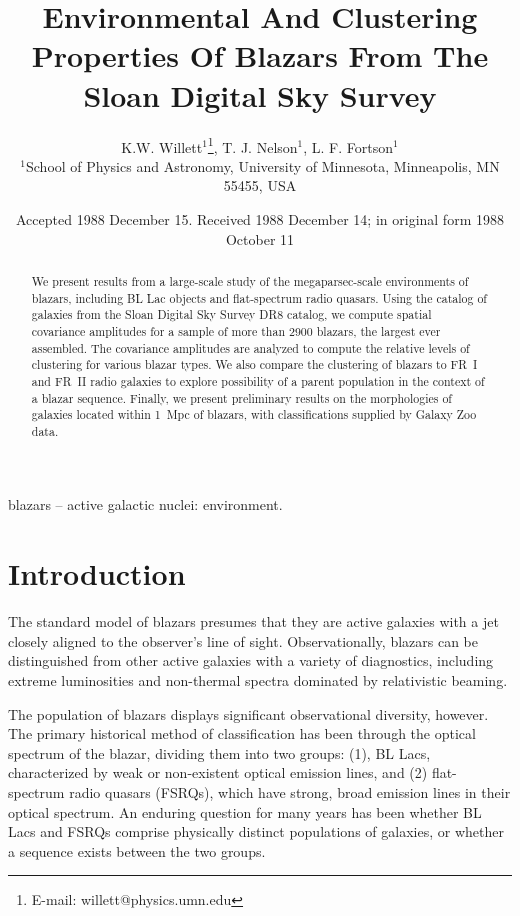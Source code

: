 \documentclass[useAMS,usenatbib]{mn2e}
\title[Clustering properties of blazars]{Environmental And Clustering Properties Of Blazars From The Sloan Digital Sky Survey}
\author[K.W. Willett, T.J. Nelson, \& L.F. Fortson]{K.W. Willett$^{1}$\thanks{E-mail: willett@physics.umn.edu}, T. J. Nelson$^{1}$, L. F. Fortson$^{1}$\\
$^{1}$School of Physics and Astronomy, University of Minnesota, Minneapolis, MN 55455, USA}
\begin{document}
\date{Accepted 1988 December 15. Received 1988 December 14; in original form 1988 October 11}

\pagerange{\pageref{firstpage}--\pageref{lastpage}} 

\maketitle

\label{firstpage}

\begin{abstract}
We present results from a large-scale study of the megaparsec-scale environments of blazars, including BL Lac objects and flat-spectrum radio quasars. Using the catalog of galaxies from the Sloan Digital Sky Survey DR8 catalog, we compute spatial covariance amplitudes for a sample of more than 2900 blazars, the largest ever assembled. The covariance amplitudes are analyzed to compute the relative levels of clustering for various blazar types. We also compare the clustering of blazars to FR~I and FR~II radio galaxies to explore possibility of a parent population in the context of a blazar sequence. Finally, we present preliminary results on the morphologies of galaxies located within 1~Mpc of blazars, with classifications supplied by Galaxy Zoo data.
\end{abstract}

\begin{keywords}
blazars -- active galactic nuclei: environment.
\end{keywords}

\section{Introduction} \label{sec-intro}


The standard model of blazars presumes that they are active galaxies with a jet closely aligned to the observer's line of sight. Observationally, blazars can be distinguished from other active galaxies with a variety of diagnostics, including extreme luminosities and non-thermal spectra dominated by relativistic beaming. 

The population of blazars displays significant observational diversity, however. The primary historical method of classification has been through the optical spectrum of the blazar, dividing them into two groups: (1), BL Lacs, characterized by weak or non-existent optical emission lines, and (2) flat-spectrum radio quasars (FSRQs), which have strong, broad emission lines in their optical spectrum. An enduring question for many years has been whether BL Lacs and FSRQs comprise physically distinct populations of galaxies, or whether a sequence exists between the two groups. 
\end{document}
